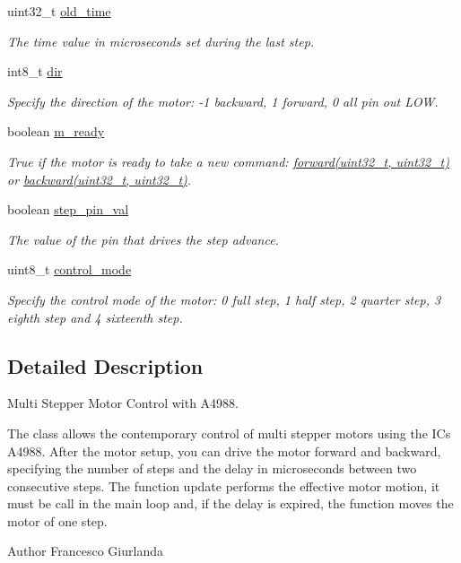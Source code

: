 \begin{DoxyCompactItemize}
uint32\+\_\+t \hyperlink{class_m_s_m_c___a4988_a60ff02342382a71526d14fb9e51ddc2a}{old\+\_\+time}
\begin{DoxyCompactList}\small\item\em The time value in microseconds set during the last step. \end{DoxyCompactList}\item 
int8\+\_\+t \hyperlink{class_m_s_m_c___a4988_a887a3d29966bdfc0d920d339b83e5346}{dir}
\begin{DoxyCompactList}\small\item\em Specify the direction of the motor\+: -\/1 backward, 1 forward, 0 all pin out L\+O\+W. \end{DoxyCompactList}\item 
boolean \hyperlink{class_m_s_m_c___a4988_a86ef4c886ee6c7ed6fa87e27c0a7a9ea}{m\+\_\+ready}
\begin{DoxyCompactList}\small\item\em True if the motor is ready to take a new command\+: \hyperlink{class_m_s_m_c___a4988_a9acdbabf546656a6436e89579e8fcfca}{forward(uint32\+\_\+t, uint32\+\_\+t)} or \hyperlink{class_m_s_m_c___a4988_a836bed9e28e723ead2a94446bb704869}{backward(uint32\+\_\+t, uint32\+\_\+t)}. \end{DoxyCompactList}\item 
boolean \hyperlink{class_m_s_m_c___a4988_a1ec86b6286b8827eca6d5703a02f65fd}{step\+\_\+pin\+\_\+val}
\begin{DoxyCompactList}\small\item\em The value of the pin that drives the step advance. \end{DoxyCompactList}\item 
uint8\+\_\+t \hyperlink{class_m_s_m_c___a4988_a819ff8eed30ef364c710a1fb1371d18e}{control\+\_\+mode}
\begin{DoxyCompactList}\small\item\em Specify the control mode of the motor\+: 0 full step, 1 half step, 2 quarter step, 3 eighth step and 4 sixteenth step. \end{DoxyCompactList}\end{DoxyCompactItemize}


\subsection{Detailed Description}
Multi Stepper Motor Control with A4988. 

The class allows the contemporary control of multi stepper motors using the I\+Cs A4988. After the motor setup, you can drive the motor forward and backward, specifying the number of steps and the delay in microseconds between two consecutive steps. The function update performs the effective motor motion, it must be call in the main loop and, if the delay is expired, the function moves the motor of one step. \begin{DoxyAuthor}{Author}
Francesco Giurlanda 
\end{DoxyAuthor}


